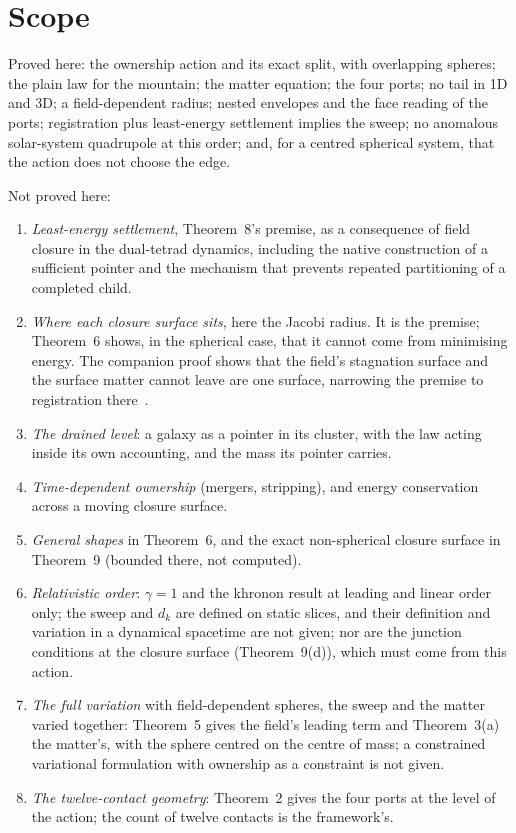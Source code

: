 \documentclass[twocolumn]{iopjournal}
\begin{document}

\section*{Scope}

Proved here: the ownership action and its exact split, with
overlapping spheres; the plain law for the mountain; the matter
equation; the four ports; no tail in 1D and 3D; a field-dependent
radius; nested envelopes and the face reading of the ports;
registration plus least-energy settlement implies the sweep; no
anomalous solar-system quadrupole at this order; and, for
a centred spherical system, that the action does not choose the edge.

Not proved here:
\begin{enumerate}
\item \emph{Least-energy settlement}, Theorem~8's premise, as a
consequence of field closure in the dual-tetrad dynamics, including
the native construction of a sufficient pointer and the mechanism
that prevents repeated partitioning of a completed child.
\item \emph{Where each closure surface sits}, here the Jacobi radius.
It is the premise; Theorem~6 shows, in the spherical case, that it
cannot come from minimising energy. The companion proof shows that the
field's stagnation surface and the surface matter cannot leave are one
surface, narrowing the premise to registration there~\cite{NelsonCS}.
\item \emph{The drained level}: a galaxy as a pointer in its cluster,
with the law acting inside its own accounting, and the mass its pointer
carries.
\item \emph{Time-dependent ownership} (mergers, stripping), and energy
conservation across a moving closure surface.
\item \emph{General shapes} in Theorem~6, and the exact
non-spherical closure surface in Theorem~9 (bounded there, not
computed).
\item \emph{Relativistic order}: $\gamma = 1$ and the khronon result at
leading and linear order only; the sweep and $d_k$ are defined on
static slices, and their definition and variation in a dynamical
spacetime are not given; nor are the junction conditions at the
closure surface (Theorem~9(d)), which must come from this action.
\item \emph{The full variation} with field-dependent spheres, the sweep
and the matter varied together: Theorem~5 gives the field's leading
term and Theorem~3(a) the matter's, with the sphere centred on the
centre of mass; a constrained variational formulation with ownership
as a constraint is not given.
\item \emph{The twelve-contact geometry}: Theorem~2 gives the four ports
at the level of the action; the count of twelve contacts is the
framework's.
\end{enumerate}
\end{document}
